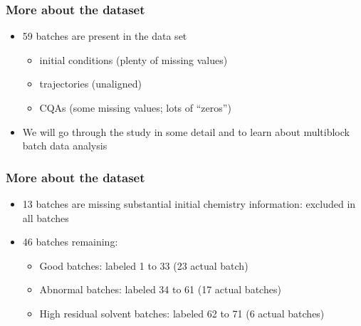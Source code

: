 \begin{frame}\frametitle{More about the dataset}

\begin{itemize}
	\item	59 batches are present in the data set
	
	\begin{itemize}
		\item	initial conditions (plenty of missing values)
		
		\item	trajectories (unaligned)
		
		\item	CQAs (some missing values; lots of ``zeros'')
	\end{itemize}

	\item	We will go through the study in some detail and to learn about  {\color{myOrange}multiblock batch data analysis}
\end{itemize}

\end{frame}

\begin{frame}\frametitle{More about the dataset}

\begin{itemize}
	\item	13 batches are missing substantial initial chemistry information: excluded in all batches
	
	\item	46 batches remaining:
	
	\begin{itemize}
		\item	Good batches: labeled 1 to 33 (23 actual batch)

		\item	Abnormal batches: labeled 34 to 61 (17 actual batches)

		\item	High residual solvent batches: labeled 62 to 71 (6 actual batches)
	\end{itemize}
\end{itemize}

\end{frame}

